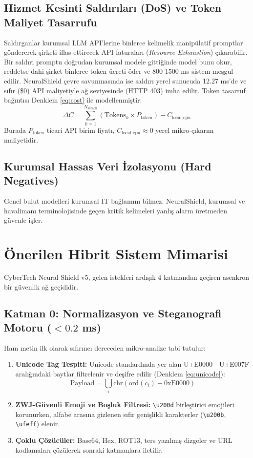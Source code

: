 \documentclass[conference]{IEEEtran}
\begin{document}
\subsection{Hizmet Kesinti Saldırıları (DoS) ve Token Maliyet Tasarrufu}
Saldırganlar kurumsal LLM API'lerine binlerce kelimelik manipülatif promptlar göndererek şirketi iflas ettirecek API faturaları (\textit{Resource Exhaustion}) çıkarabilir. Bir saldırı promptu doğrudan kurumsal modele gittiğinde model bunu okur, reddetse dahi şirket binlerce token ücreti öder ve 800-1500 ms sistem meşgul edilir. NeuralShield çevre savunmasında ise saldırı yerel sunucuda 12.27 ms'de ve sıfır (\$0) API maliyetiyle ağ seviyesinde (HTTP 403) imha edilir. Token tasarruf bağıntısı Denklem \eqref{eq:cost} ile modellenmiştir:
\begin{equation}
\Delta C = \sum_{k=1}^{N_{\text{attack}}} \left( \text{Tokens}_k \times P_{\text{token}} \right) - C_{\text{local\_cpu}}
\label{eq:cost}
\end{equation}
Burada $P_{\text{token}}$ ticari API birim fiyatı, $C_{\text{local\_cpu}} \approx 0$ yerel mikro-çıkarım maliyetidir.

\subsection{Kurumsal Hassas Veri İzolasyonu (Hard Negatives)}
Genel bulut modelleri kurumsal IT bağlamını bilmez. NeuralShield, kurumsal ve havalimanı terminolojisinde geçen kritik kelimeleri yanlış alarm üretmeden güvenle işler.

\section{Önerilen Hibrit Sistem Mimarisi}
CyberTech Neural Shield v5, gelen istekleri ardışık 4 katmandan geçiren asenkron bir güvenlik ağ geçididir.

\subsection{Katman 0: Normalizasyon ve Steganografi Motoru ($<0.2$ ms)}
Ham metin ilk olarak sıfırıncı dereceden mikro-analize tabi tutulur:
\begin{enumerate}
    \item \textbf{Unicode Tag Tespiti:} Unicode standardında yer alan U+E0000 - U+E007F aralığındaki baytlar filtrelenir ve deşifre edilir (Denklem \ref{eq:unicode}):
    \begin{equation}
    \text{Payload} = \bigcup_{i} \text{chr}(\text{ord}(c_i) - \text{0xE0000})
    \label{eq:unicode}
    \end{equation}
    \item \textbf{ZWJ-Güvenli Emoji ve Boşluk Filtresi:} \texttt{\textbackslash u200d} birleştirici emojileri korunurken, alfabe arasına gizlenen sıfır genişlikli karakterler (\texttt{\textbackslash u200b}, \texttt{\textbackslash ufeff}) elenir.
    \item \textbf{Çoklu Çözücüler:} Base64, Hex, ROT13, ters yazılmış dizgeler ve URL kodlamaları çözülerek sonraki katmanlara iletilir.
\end{enumerate}
\end{document}
